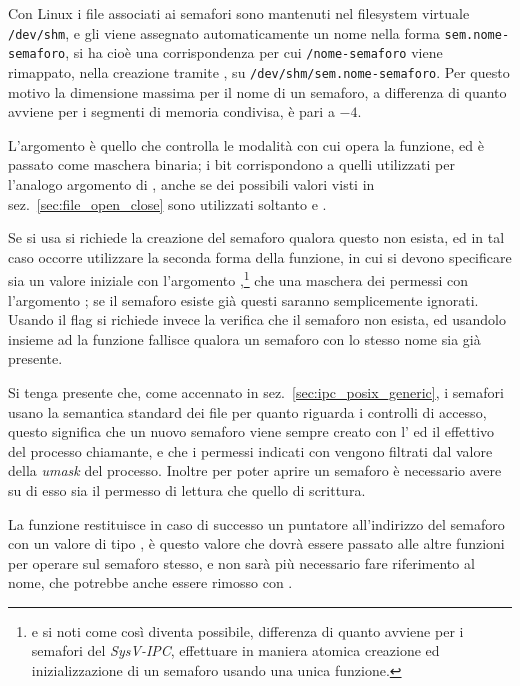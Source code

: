 Con Linux i file associati ai semafori sono mantenuti nel filesystem virtuale
\texttt{/dev/shm}, e gli viene assegnato automaticamente un nome nella forma
\texttt{sem.nome-semaforo}, si ha cioè una corrispondenza per cui
\texttt{/nome-semaforo} viene rimappato, nella creazione tramite
, su \texttt{/dev/shm/sem.nome-semaforo}. Per questo motivo la
dimensione massima per il nome di un semaforo, a differenza di quanto avviene
per i segmenti di memoria condivisa, è pari a $ - 4$.

L'argomento  è quello che controlla le modalità con cui opera la
funzione, ed è passato come maschera binaria; i bit corrispondono a quelli
utilizzati per l'analogo argomento di , anche se dei possibili
valori visti in sez.~\ref{sec:file_open_close} sono utilizzati soltanto
 e .

Se si usa  si richiede la creazione del semaforo qualora
questo non esista, ed in tal caso occorre utilizzare la seconda forma della
funzione, in cui si devono specificare sia un valore iniziale con l'argomento
,\footnote{e si noti come così diventa possibile, differenza di
  quanto avviene per i semafori del \textit{SysV-IPC}, effettuare in maniera
  atomica creazione ed inizializzazione di un semaforo usando una unica
  funzione.} che una maschera dei permessi con l'argomento
; se il semaforo esiste già questi saranno semplicemente
ignorati. Usando il flag  si richiede invece la verifica che il
semaforo non esista, ed usandolo insieme ad  la funzione
fallisce qualora un semaforo con lo stesso nome sia già presente.

Si tenga presente che, come accennato in sez.~\ref{sec:ipc_posix_generic}, i
semafori usano la semantica standard dei file per quanto riguarda i controlli
di accesso, questo significa che un nuovo semaforo viene sempre creato con
l' ed il  effettivo del processo chiamante, e che i permessi
indicati con  vengono filtrati dal valore della \textit{umask} del
processo.  Inoltre per poter aprire un semaforo è necessario avere su di esso
sia il permesso di lettura che quello di scrittura.

La funzione restituisce in caso di successo un puntatore all'indirizzo del
semaforo con un valore di tipo , è questo valore che dovrà
essere passato alle altre funzioni per operare sul semaforo stesso, e non sarà
più necessario fare riferimento al nome, che potrebbe anche essere rimosso con
.

